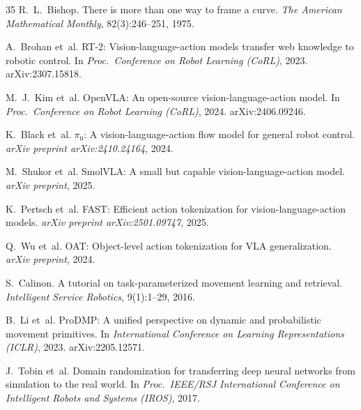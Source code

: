 \documentclass[11pt]{article}
\begin{document}
\begin{thebibliography}{35}
  R.~L.~Bishop.
  \newblock There is more than one way to frame a curve.
  \newblock \emph{The American Mathematical Monthly}, 82(3):246--251, 1975.

  A.~Brohan et~al.
  \newblock RT-2: Vision-language-action models transfer web knowledge to robotic control.
  \newblock In \emph{Proc.\ Conference on Robot Learning (CoRL)}, 2023.
  \newblock arXiv:2307.15818.

  M.~J.~Kim et~al.
  \newblock OpenVLA: An open-source vision-language-action model.
  \newblock In \emph{Proc.\ Conference on Robot Learning (CoRL)}, 2024.
  \newblock arXiv:2406.09246.

  K.~Black et~al.
  \newblock $\pi_0$: A vision-language-action flow model for general robot control.
  \newblock \emph{arXiv preprint arXiv:2410.24164}, 2024.

  M.~Shukor et~al.
  \newblock SmolVLA: A small but capable vision-language-action model.
  \newblock \emph{arXiv preprint}, 2025.

  K.~Pertsch et~al.
  \newblock FAST: Efficient action tokenization for vision-language-action models.
  \newblock \emph{arXiv preprint arXiv:2501.09747}, 2025.

  Q.~Wu et~al.
  \newblock OAT: Object-level action tokenization for VLA generalization.
  \newblock \emph{arXiv preprint}, 2024.

  S.~Calinon.
  \newblock A tutorial on task-parameterized movement learning and retrieval.
  \newblock \emph{Intelligent Service Robotics}, 9(1):1--29, 2016.

  B.~Li et~al.
  \newblock ProDMP: A unified perspective on dynamic and probabilistic movement primitives.
  \newblock In \emph{International Conference on Learning Representations (ICLR)}, 2023.
  \newblock arXiv:2205.12571.

  J.~Tobin et~al.
  \newblock Domain randomization for transferring deep neural networks from simulation to the real world.
  \newblock In \emph{Proc.\ IEEE/RSJ International Conference on Intelligent Robots and Systems (IROS)}, 2017.

\end{thebibliography}

\appendix
\end{document}
